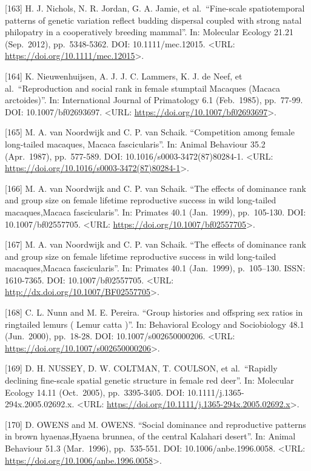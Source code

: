 \documentclass[
]{article}
\begin{document}
{[}163{]} H. J. Nichols, N. R. Jordan, G. A. Jamie, et al.~``Fine-scale
spatiotemporal patterns of genetic variation reflect budding dispersal
coupled with strong natal philopatry in a cooperatively breeding
mammal''. In: Molecular Ecology 21.21 (Sep.~2012), pp.~5348-5362. DOI:
10.1111/mec.12015. \textless URL:
\url{https://doi.org/10.1111/mec.12015}\textgreater.

{[}164{]} K. Nieuwenhuijsen, A. J. J. C. Lammers, K. J. de Neef, et
al.~``Reproduction and social rank in female stumptail Macaques (Macaca
arctoides)''. In: International Journal of Primatology 6.1 (Feb.~1985),
pp.~77-99. DOI: 10.1007/bf02693697. \textless URL:
\url{https://doi.org/10.1007/bf02693697}\textgreater.

{[}165{]} M. A. van Noordwijk and C. P. van Schaik. ``Competition among
female long-tailed macaques, Macaca fascicularis''. In: Animal Behaviour
35.2 (Apr.~1987), pp.~577-589. DOI: 10.1016/s0003-3472(87)80284-1.
\textless URL:
\url{https://doi.org/10.1016/s0003-3472(87)80284-1}\textgreater.

{[}166{]} M. A. van Noordwijk and C. P. van Schaik. ``The effects of
dominance rank and group size on female lifetime reproductive success in
wild long-tailed macaques,Macaca fascicularis''. In: Primates 40.1
(Jan.~1999), pp.~105-130. DOI: 10.1007/bf02557705. \textless URL:
\url{https://doi.org/10.1007/bf02557705}\textgreater.

{[}167{]} M. A. van Noordwijk and C. P. van Schaik. ``The effects of
dominance rank and group size on female lifetime reproductive success in
wild long-tailed macaques,Macaca fascicularis''. In: Primates 40.1
(Jan.~1999), p.~105--130. ISSN: 1610-7365. DOI: 10.1007/bf02557705.
\textless URL: \url{http://dx.doi.org/10.1007/BF02557705}\textgreater.

{[}168{]} C. L. Nunn and M. E. Pereira. ``Group histories and offspring
sex ratios in ringtailed lemurs ( Lemur catta )''. In: Behavioral
Ecology and Sociobiology 48.1 (Jun.~2000), pp.~18-28. DOI:
10.1007/s002650000206. \textless URL:
\url{https://doi.org/10.1007/s002650000206}\textgreater.

{[}169{]} D. H. NUSSEY, D. W. COLTMAN, T. COULSON, et al.~``Rapidly
declining fine-scale spatial genetic structure in female red deer''. In:
Molecular Ecology 14.11 (Oct.~2005), pp.~3395-3405. DOI:
10.1111/j.1365-294x.2005.02692.x. \textless URL:
\url{https://doi.org/10.1111/j.1365-294x.2005.02692.x}\textgreater.

{[}170{]} D. OWENS and M. OWENS. ``Social dominance and reproductive
patterns in brown hyaenas,Hyaena brunnea, of the central Kalahari
desert''. In: Animal Behaviour 51.3 (Mar.~1996), pp.~535-551. DOI:
10.1006/anbe.1996.0058. \textless URL:
\url{https://doi.org/10.1006/anbe.1996.0058}\textgreater.
\end{document}
